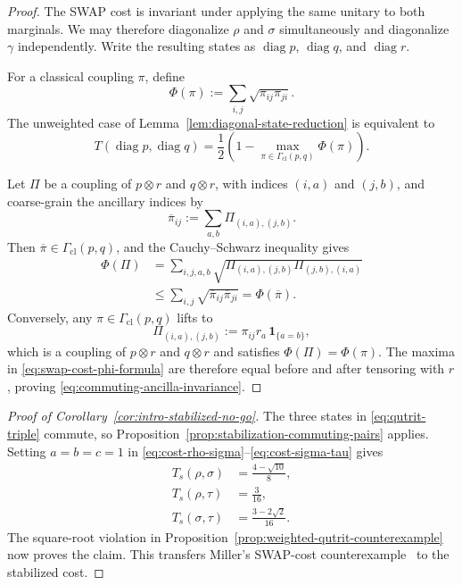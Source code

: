 \documentclass[11pt]{article}
\newcommand{\diag} {\operatorname{diag}}
\begin{document}
\begin{proof}
    The SWAP cost is invariant under applying the same unitary to both
    marginals.  We may therefore diagonalize $\rho$ and $\sigma$
    simultaneously and diagonalize $\gamma$ independently.  Write the
    resulting states as $\diag p$, $\diag q$, and $\diag r$.

    For a classical coupling $\pi$, define
    \begin{equation}\label{eq:phi-functional}
        \Phi(\pi):=\sum_{i,j}\sqrt{\pi_{ij}\pi_{ji}}.
    \end{equation}
    The unweighted case of Lemma~\ref{lem:diagonal-state-reduction} is
    equivalent to
    \begin{equation}\label{eq:swap-cost-phi-formula}
        T(\diag p,\diag q)
        =\frac12\left(
        1-\max_{\pi\in\Gamma_{\mathrm{cl}}(p,q)}\Phi(\pi)
        \right).
    \end{equation}

    Let $\Pi$ be a coupling of $p\otimes r$ and $q\otimes r$, with indices
    $(i,a)$ and $(j,b)$, and coarse-grain the ancillary indices by
    \[
        \overline\pi_{ij}
        :=\sum_{a,b}\Pi_{(i,a),(j,b)}.
    \]
    Then $\overline\pi\in\Gamma_{\mathrm{cl}}(p,q)$, and the
    Cauchy--Schwarz inequality gives
    \begin{align*}
        \Phi(\Pi)
        &=\sum_{i,j,a,b}
          \sqrt{\Pi_{(i,a),(j,b)}\Pi_{(j,b),(i,a)}}\\
        &\leq\sum_{i,j}
          \sqrt{\overline\pi_{ij}\overline\pi_{ji}}
          =\Phi(\overline\pi).
    \end{align*}
    Conversely, any $\pi\in\Gamma_{\mathrm{cl}}(p,q)$ lifts to
    \[
        \Pi_{(i,a),(j,b)}
        :=\pi_{ij}r_a\,\mathbf{1}_{\{a=b\}},
    \]
    which is a coupling of $p\otimes r$ and $q\otimes r$ and satisfies
    $\Phi(\Pi)=\Phi(\pi)$.  The maxima in
    \eqref{eq:swap-cost-phi-formula} are therefore equal before and after
    tensoring with $r$, proving \eqref{eq:commuting-ancilla-invariance}.
\end{proof}

\begin{proof}[Proof of Corollary~\ref{cor:intro-stabilized-no-go}]
    The three states in \eqref{eq:qutrit-triple} commute, so
    Proposition~\ref{prop:stabilization-commuting-pairs} applies.  Setting
    $a=b=c=1$ in
    \eqref{eq:cost-rho-sigma}--\eqref{eq:cost-sigma-tau} gives
    \begin{align*}
        T_s(\rho,\sigma)&=\frac{4-\sqrt{10}}8,\\
        T_s(\rho,\tau)&=\frac3{16},\\
        T_s(\sigma,\tau)&=\frac{3-2\sqrt2}{16}.
    \end{align*}
    The square-root violation in
    Proposition~\ref{prop:weighted-qutrit-counterexample} now proves the
    claim.  This transfers Miller's SWAP-cost counterexample~\cite{Mil26}
    to the stabilized cost.
\end{proof}
\end{document}
